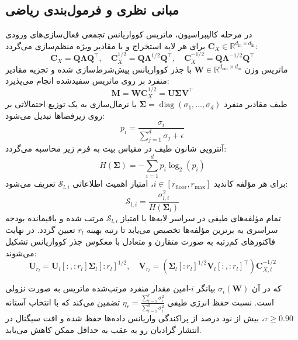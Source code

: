 \subsection{مبانی نظری و فرمول‌بندی ریاضی}
در مرحله کالیبراسیون، ماتریس کوواریانس تجمعی فعال‌سازی‌های ورودی $\mathbf{C}_X \in \mathbb{R}^{d_{\text{in}} \times d_{\text{in}}}$ برای هر لایه استخراج و با مقادیر ویژه منظم‌سازی می‌گردد:
\begin{equation}
\mathbf{C}_X = \mathbf{Q} \mathbf{\Lambda} \mathbf{Q}^\top, \quad \mathbf{C}_X^{1/2} = \mathbf{Q} \mathbf{\Lambda}^{1/2} \mathbf{Q}^\top, \quad \mathbf{C}_X^{-1/2} = \mathbf{Q} \mathbf{\Lambda}^{-1/2} \mathbf{Q}^\top
\end{equation}
ماتریس وزن $\mathbf{W} \in \mathbb{R}^{d_{\text{out}} \times d_{\text{in}}}$ با جذر کوواریانس پیش‌شرط‌سازی شده و تجزیه مقادیر منفرد بر روی ماتریس سفیدشده انجام می‌پذیرد:
\begin{equation}
\mathbf{M} = \mathbf{W} \mathbf{C}_X^{1/2} = \mathbf{U} \mathbf{\Sigma} \mathbf{V}^\top
\end{equation}
طیف مقادیر منفرد $\mathbf{\Sigma} = \operatorname{diag}(\sigma_1, \dots, \sigma_d)$ با نرمال‌سازی به یک توزیع احتمالاتی بر روی زیرفضاها تبدیل می‌شود:
\begin{equation}
p_i = \frac{\sigma_i}{\sum_{j=1}^d \sigma_j + \epsilon}
\end{equation}
آنتروپی شانون طیف در مقیاس بیت به فرم زیر محاسبه می‌گردد:
\begin{equation}
H(\mathbf{\Sigma}) = -\sum_{i=1}^d p_i \log_2(p_i)
\end{equation}
برای هر مؤلفه کاندید $i \in [r_{\text{floor}}, r_{\max}]$، امتیاز اهمیت اطلاعاتی $\mathcal{S}_{l, i}$ تعریف می‌شود:
\begin{equation}
\mathcal{S}_{l, i} = \frac{\sigma_{l, i}^2}{H(\mathbf{\Sigma}_l)}
\end{equation}
تمام مؤلفه‌های طیفی در سراسر لایه‌ها با امتیاز $\mathcal{S}_{l, i}$ مرتب شده و باقیمانده بودجه سراسری به برترین مؤلفه‌ها تخصیص می‌یابد تا رتبه بهینه $r_l$ تعیین گردد. در نهایت فاکتورهای کم‌رتبه به صورت متقارن و متعادل با معکوس جذر کوواریانس تشکیل می‌شوند:
\begin{equation}
\mathbf{U}_{r_l} = \mathbf{U}_l[:, :r_l] \mathbf{\Sigma}_l[:r_l]^{1/2}, \quad \mathbf{V}_{r_l} = (\mathbf{\Sigma}_l[:r_l]^{1/2} \mathbf{V}_l[:, :r_l]^\top) \mathbf{C}_{X, l}^{-1/2}
\end{equation}

که در آن $\sigma_i(\mathbf{W})$ بیانگر $i$-امین مقدار منفرد مرتب‌شده ماتریس به صورت نزولی است. نسبت حفظ انرژی طیفی $\eta_r = \frac{\sum_{i=1}^r \sigma_i^2}{\sum_{i=1}^{d} \sigma_i^2}$ تضمین می‌کند که با انتخاب آستانه $\tau \ge 0.90$، بیش از نود درصد از پراکندگی واریانس داده‌ها حفظ شده و افت سیگنال در انتشار گرادیان رو به عقب به حداقل ممکن کاهش می‌یابد.

